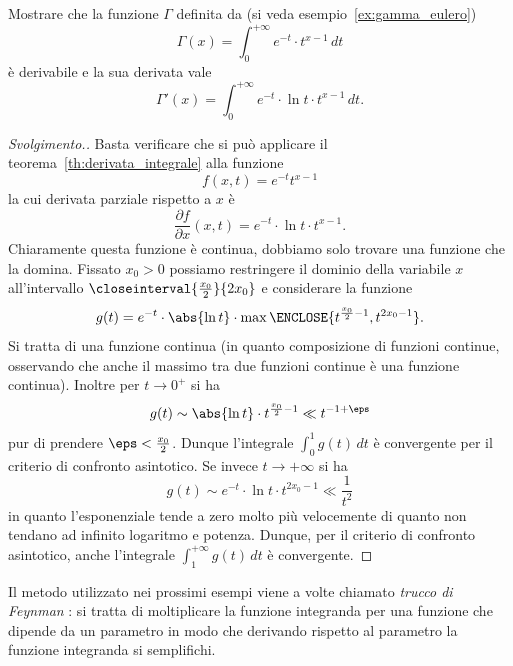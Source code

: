 \begin{exercise}
  Mostrare 
  che la funzione $\Gamma$ definita da (si veda esempio~\ref{ex:gamma_eulero})
  \[
   \Gamma(x) = \int_0^{+\infty} e^{-t}\cdot t^{x-1}\, dt 
  \]
  è derivabile e la sua derivata vale 
  \[
  \Gamma'(x) = \int_0^{+\infty} e^{-t}\cdot \ln t \cdot t^{x-1}\, dt.  
  \]
\end{exercise}
\begin{proof}[Svolgimento.]
Basta verificare che si può applicare il teorema~\ref{th:derivata_integrale}
alla funzione 
\[
  f(x,t) = e^{-t}t^{x-1}
\]
la cui derivata parziale rispetto a $x$ è 
\[
  \frac{\partial f}{\partial x}(x,t) = e^{-t}\cdot \ln t \cdot t^{x-1}.  
\]
Chiaramente questa funzione è continua, dobbiamo solo trovare una funzione 
che la domina. Fissato $x_0>0$ possiamo restringere il dominio della 
variabile $x$ all'intervallo $\closeinterval{\frac{x_0} 2}{2x_0}$ e considerare
la funzione 
\[
  g(t) = e^{-t} \cdot \abs{\ln t}\cdot \max\ENCLOSE{t^{\frac {x_0} 2 -1},t^{2x_0 -1}}.
\]
Si tratta di una funzione continua (in quanto composizione di funzioni continue, 
osservando che anche il massimo tra due funzioni continue è una funzione continua).
Inoltre per $t\to 0^+$ si ha 
\[
  g(t) \sim \abs{\ln t}\cdot t^{\frac{x_0}{2}-1} 
  \ll t^{-1+\eps}
\]
pur di prendere $\eps < \frac{x_0}{2}$.
Dunque l'integrale $\int_0^1 g(t)\, dt$ è convergente per 
il criterio di confronto asintotico.
Se invece $t\to +\infty$ si ha 
\[
  g(t) \sim e^{-t}\cdot \ln t \cdot t^{2x_0-1} \ll \frac{1}{t^2}  
\]
in quanto l'esponenziale tende a zero molto più velocemente 
di quanto non tendano ad infinito logaritmo e potenza.
Dunque, per il criterio di confronto asintotico, 
anche l'integrale $\int_1^{+\infty} g(t)\, dt$ è convergente.
\end{proof}

Il metodo utilizzato nei prossimi esempi viene a volte chiamato
 \emph{trucco di Feynman}%
:
%
%
si tratta di moltiplicare la funzione integranda per una funzione 
che dipende da un parametro in modo che derivando rispetto al parametro 
la funzione integranda si semplifichi.

